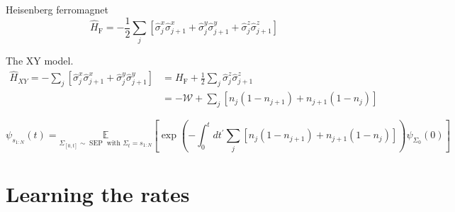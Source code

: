 Heisenberg ferromagnet
\begin{equation}
\hat H_{\mathrm{F}}=-\frac{1}{2} \sum_{j}\left[\hat{\sigma}_{j}^{x} \hat{\sigma}_{j+1}^{x}+\hat{\sigma}_{j}^{y} \hat{\sigma}_{j+1}^{y}+\hat{\sigma}_{j}^{z} \hat{\sigma}_{j+1}^{z}\right]
\end{equation}

The XY model.
\begin{equation}
\begin{aligned} 
\hat H_{X Y}=-\sum_{j}\left[\hat{\sigma}_{j}^{x} \hat{\sigma}_{j+1}^{x}+\hat{\sigma}_{j}^{y} \hat{\sigma}_{j+1}^{y}\right] &=H_{\mathrm{F}}+\frac{1}{2} \sum_{j} \hat{\sigma}_{j}^{z} \hat{\sigma}_{j+1}^{z} \\ 						&=-\mathcal{W}+\sum_{j}\left[n_{j}\left(1-n_{j+1}\right)+n_{j+1}\left(1-n_{j}\right)\right] 
\end{aligned}
\end{equation}

\begin{equation}
\psi_{s_{1: N}}(t)=\underset{\Sigma_{[0, t]} \sim \operatorname{SEP} \text{ with } \Sigma_{t}=s_{1: N}}{\mathbb{E}}
\left[\exp \left(-\int_{0}^{t} d t^{\prime} \sum_{j}\left[n_{j}\left(1-n_{j+1}\right)+n_{j+1}\left(1-n_{j}\right)\right]\right) \psi_{\Sigma_{0}}(0)\right]
\end{equation}


\section{Learning the rates} 
